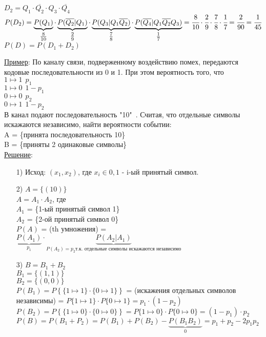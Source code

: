\begin{enumerate}
$D_2 = Q_1 \cdot \overline{Q_2} \cdot Q_3 \cdot \overline{Q_4}$ \\
$P(D_2) = \underbrace{P(Q_1)}_{\tfrac{8}{10}} \cdot \underbrace{P(\overline{Q_2}|Q_1)}_{\tfrac{2}{9}} \cdot \underbrace{P(Q_3|Q_1 \overline{Q_2})}_{\tfrac{7}{8}} \cdot \underbrace{P(\overline{Q_4}|Q_1 \overline{Q_2} Q_3)}_{\tfrac{1}{7}} = \cfrac{8}{10} \cdot \cfrac{2}{9} \cdot \cfrac{7}{8} \cdot \cfrac{1}{7} = \cfrac{2}{90} = \cfrac{1}{45}$ \\

$P(D) = P(D_1 + D_2)$ \\
\end{enumerate}


\underline{Пример}: По каналу связи, подверженному воздействию помех, передаются кодовые последовательности из 0 и 1. При этом вероятность того, что \\
$1 \mapsto 1 \ \ p_1$ \\
$1 \mapsto 0 \ \ 1 - p_1$ \\
$0 \mapsto 0 \ \ p_2$ \\
$0 \mapsto 1 \ \ 1 - p_2$ \\
В канал подают последовательность "10"\ . Считая, что отдельные символы искажаются независимо, найти вероятности событии: \\
A = \{принята последовательность 10\} \\
B = \{приняты 2 одинаковые символы\} \\
\underline{Решение}: \\
\begin{enumerate}
\item[1)] Исход: $(x_1, x_2)$, где $x_i \in {0, 1}$ - i-ый принятый символ.

\item[2)] $A = \{(10)\}$ \\
$A = A_1 \cdot A_2$, где \\
$A_1$ = \{1-ый принятый символ 1\} \\
$A_2$ = \{2-ой принятый символ 0\} \\
$P(A)$ = (th умножения) = $\underbrace{P(A_1)}_{p_1} \cdot \underbrace{P(A_2|A_1)}_{P(A_2) = p_2 \text{т.к. отдельные символы искажаются независимо}}$ \\

\item[3)] $B = B_1 + B_2$ \\
$B_1 = \{(1,1)\}$ \\
$B_2 = \{(0,0)\}$ \\
$P(B_1) = P \left\{ \{1 \mapsto 1\} \cdot \{0 \mapsto 1\} \right\}$ = (искажения отдельных символов независимы) = $P\{1 \mapsto 1\} \cdot P\{0 \mapsto 1\} = p_1 \cdot (1 - p_2)$ \\

$P(B_2) = P \left\{ \{1 \mapsto 0\} \cdot \{0 \mapsto 0\} \right\} = P\{1 \mapsto 0\} \cdot P\{0 \mapsto 0\} = (1 - p_1) \cdot p_2$ \\

$P(B) = P(B_1 + P_2) = P(B_1) + P(B_2) - \underbrace{P(B_1 B_2)}_{0} = p_1 + p_2 - 2p_1 p_2$\\
\end{enumerate}



